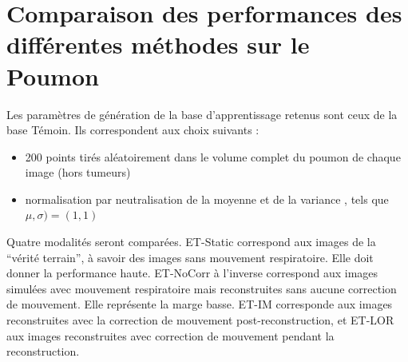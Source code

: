 \section{Comparaison des performances des différentes méthodes sur le Poumon}

Les paramètres de génération de la base d'apprentissage retenus sont ceux de la base Témoin. Ils correspondent aux choix suivants :

\begin{itemize}
 \item 200 points tirés aléatoirement dans le volume complet du poumon de chaque image (hors tumeurs)
 \item normalisation par neutralisation de la moyenne et de la variance , tels que $\mu, \sigma) = (1,1)$
\end{itemize}


Quatre modalités seront comparées. ET-Static correspond aux images de la ``vérité terrain'', à savoir des images sans mouvement respiratoire. Elle doit donner la performance haute. ET-NoCorr à l'inverse correspond aux images simulées avec mouvement respiratoire mais reconstruites sans aucune correction de mouvement. Elle représente la marge basse. ET-IM corresponde aux images reconstruites avec la correction de mouvement post-reconstruction, et ET-LOR aux images reconstruites avec correction de mouvement pendant la reconstruction.


